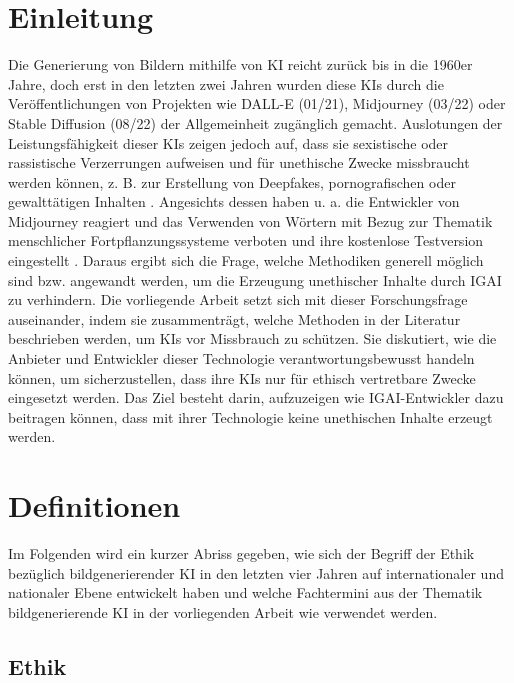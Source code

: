 \documentclass[12pt]{report}
\begin{document}
\chapter{Einleitung}
Die Generierung von Bildern mithilfe von KI reicht zurück bis in die 1960er Jahre\cite{Garcia}, doch erst in den letzten zwei Jahren wurden diese KIs durch die Veröffentlichungen von Projekten wie DALL-E (01/21), Midjourney (03/22) oder Stable Diffusion (08/22) der Allgemeinheit zugänglich gemacht. Auslotungen der Leistungsfähigkeit dieser KIs zeigen jedoch auf, dass sie sexistische oder rassistische Verzerrungen aufweisen \cite{Schmidt} und für unethische Zwecke missbraucht werden können, z. B. zur Erstellung von Deepfakes, pornografischen oder gewalttätigen Inhalten \cite{Hadero}.
Angesichts dessen haben u. a. die Entwickler von Midjourney reagiert und das Verwenden von Wörtern mit Bezug zur Thematik menschlicher Fortpflanzungssysteme verboten \cite{Heikkilae} und ihre kostenlose Testversion eingestellt \cite{NelsonMidjourney}. Daraus ergibt sich die Frage, welche Methodiken generell möglich sind bzw. angewandt werden, um die Erzeugung unethischer Inhalte durch \ac{IGAI} zu verhindern.
Die vorliegende Arbeit setzt sich mit dieser Forschungsfrage auseinander, indem sie zusammenträgt, welche Methoden in der Literatur beschrieben werden, um KIs vor Missbrauch zu schützen. Sie diskutiert, wie die Anbieter und Entwickler dieser Technologie verantwortungsbewusst handeln können, um sicherzustellen, dass ihre KIs nur für ethisch vertretbare Zwecke eingesetzt werden. Das Ziel besteht darin, aufzuzeigen wie \ac{IGAI}-Entwickler dazu beitragen können, dass mit ihrer Technologie keine unethischen Inhalte erzeugt werden.


\chapter{Definitionen}
Im Folgenden wird ein kurzer Abriss gegeben, wie sich der Begriff der Ethik bezüglich bildgenerierender KI in den letzten vier Jahren auf internationaler und nationaler Ebene entwickelt haben und welche Fachtermini aus der Thematik bildgenerierende KI in der vorliegenden Arbeit wie verwendet werden.
\section{Ethik}\label{def_ai}
\end{document}
